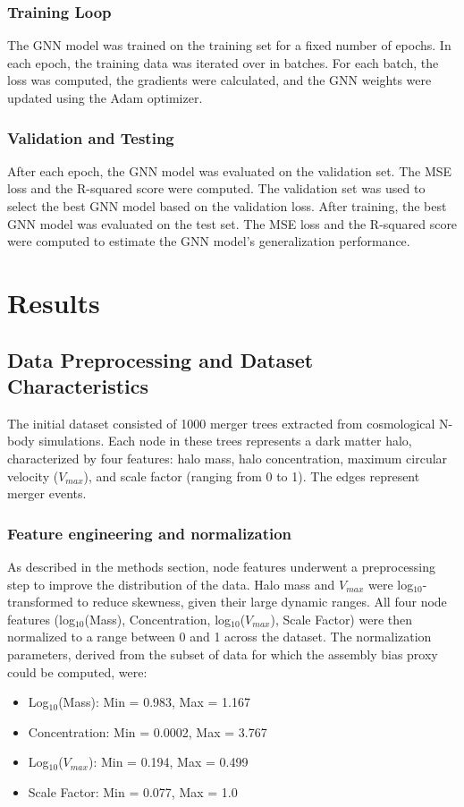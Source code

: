 \documentclass[twocolumn]{aastex631}
\begin{document}
\subsubsection{Training Loop}
The GNN model was trained on the training set for a fixed number of epochs. In each epoch, the training data was iterated over in batches. For each batch, the loss was computed, the gradients were calculated, and the GNN weights were updated using the Adam optimizer.

\subsubsection{Validation and Testing}
After each epoch, the GNN model was evaluated on the validation set. The MSE loss and the R-squared score were computed. The validation set was used to select the best GNN model based on the validation loss. After training, the best GNN model was evaluated on the test set. The MSE loss and the R-squared score were computed to estimate the GNN model's generalization performance.

\section{Results}
\label{sec:results}
\subsection{Data Preprocessing and Dataset Characteristics}

The initial dataset consisted of 1000 merger trees extracted from cosmological N-body simulations. Each node in these trees represents a dark matter halo, characterized by four features: halo mass, halo concentration, maximum circular velocity ($V_{max}$), and scale factor (ranging from 0 to 1). The edges represent merger events.

\subsubsection{Feature engineering and normalization}
As described in the methods section, node features underwent a preprocessing step to improve the distribution of the data. Halo mass and $V_{max}$ were log$_{10}$-transformed to reduce skewness, given their large dynamic ranges. All four node features (log$_{10}$(Mass), Concentration, log$_{10}$($V_{max}$), Scale Factor) were then normalized to a range between 0 and 1 across the dataset. The normalization parameters, derived from the subset of data for which the assembly bias proxy could be computed, were:
\begin{itemize}
    \item Log$_{10}$(Mass): Min = 0.983, Max = 1.167
    \item Concentration: Min = 0.0002, Max = 3.767
    \item Log$_{10}$($V_{max}$): Min = 0.194, Max = 0.499
    \item Scale Factor: Min = 0.077, Max = 1.0
\end{itemize}
\end{document}

